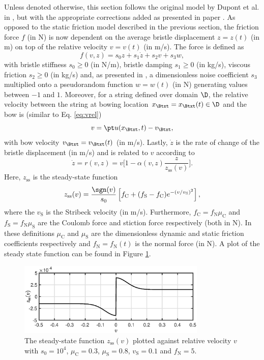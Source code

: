 Unless denoted otherwise, this section follows the original model by Dupont et al. in \cite{Dupont2002}, but with the appropriate corrections added as presented in paper \citeP[C]. As opposed to the static friction model described in the previous section, the friction force $f$ (in N) is now dependent on the average bristle displacement $z = z(t)$ (in m) on top of the relative velocity $v = v(t)$ (in m/s). The force is defined as
\begin{equation}\label{eq:elastoPlasticForce}
    f(v, z) = s_0z + s_1\dot z + s_2v + s_3w,
\end{equation}
with bristle stiffness $s_0 \geq 0$ (in N/m), bristle damping $s_1 \geq 0$ (in kg/s), viscous friction $s_2 \geq 0$ (in kg/s) and, as presented in \cite{Serafin2004}, a dimensionless noise coefficient $s_3$ multiplied onto a pseudorandom function $w = w(t)$ (in N) generating values between $-1$ and $1$. Moreover, for a string defined over domain $\D$, the relative velocity between the string at bowing location $x_\Btxt = x_\Btxt(t) \in \D$ and the bow is (similar to Eq. \eqref{eq:vrel})
\begin{equation}\label{eq:vrelElasto}
    v = \pt u(x_\Btxt,t) - v_\Btxt,
\end{equation}
with bow velocity $v_\Btxt = v_\Btxt(t)$ (in m/s). Lastly, $\dot z$ is the rate of change of the bristle displacement (in m/s) and is related to $v$ according to
\begin{equation}\label{eq:zdot}
    \dot z = r(v, z) = v \bigg[ 1-  \alpha(v, z)\frac{z}{z_\text{ss}(v)}\bigg].
\end{equation}
Here, $z_\text{ss}$ is the steady-state function
\begin{equation}\label{eq:zss}
    z_\text{ss}(v) = \frac{\sgn(v)}{s_0}\left[f_\text{C}+(f_\text{S}-f_\text{C})e^{-(v/v_\text{S})^2}\right],
\end{equation}
where the $v_\text{S}$ is the Stribeck velocity (in m/s). Furthermore, $f_\text{C} = f_\text{N}\mu_\text{C}$ and $f_\text{S} = f_\text{N}\mu_\text{S}$ are the Coulomb force and stiction force respectively (both in N). In these definitions $\mu_\text{C}$ and $\mu_\text{S}$ are the dimensionless dynamic and static friction coefficients respectively and $f_\text{N} = f_\text{N}(t)$ is the normal force (in N). A plot of the steady state function can be found in Figure \ref{fig:zss}.

\begin{figure}[ht]
    \centering
    \includegraphics[width=0.8\textwidth]{figures/exciters/steadyState.eps}
    \caption{\label{fig:zss}The steady-state function $z_\text{ss}(v)$ plotted against relative velocity $v$ with $s_0 = 10^4$, $\mu_\text{C} = 0.3$, $\mu_\text{S} = 0.8$, $v_\text{S} = 0.1$ and $f_\text{N} = 5$.}
\end{figure}

